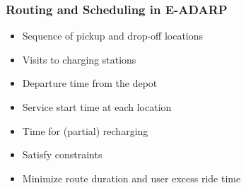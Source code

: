 \documentclass[aspectratio=1610]{beamer}
\let\oldfootnotesize\footnotesize
\renewcommand*{\footnotesize}{\oldfootnotesize\fontsize{6}{4}\selectfont}
\renewcommand{\footnotesize}{\scriptsize}
\begin{document}
\begin{frame}[noframenumbering]
	\frametitle{Routing and Scheduling in E-ADARP \\ \footnotesize{\textcolor{gray}{\cite{Cordeau:2007,Bongiovanni:2019}}}}
	
\begin{itemize}
	\item Sequence of pickup and drop-off locations
	\item Visits to charging stations 
\end{itemize} 

\bigskip

\begin{itemize}
	\item Departure time from the depot 
	\item Service start time at each location 
	\item Time for (partial) recharging 
\end{itemize}

\bigskip

\begin{itemize}
	\item Satisfy constraints 
	\item Minimize route duration and user excess ride time 
\end{itemize}
	
\end{frame}
\end{document}
